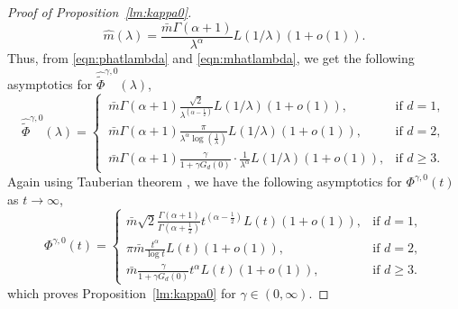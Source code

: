\documentclass{article}[12pt]
\theoremstyle{definition}
\newcommand{\1}{\mathbbm{1}}
\begin{document}
\begin{proof}[Proof of Proposition~\ref{lm:kappa0}]
\begin{equation}
\hat{m}(\lambda) = \frac{\bar{m}{\Gamma(\alpha + 1)}}{\lambda^{\alpha}}L(1/\lambda)(1+o(1)).
\label{eqn:mhatlambda}
\end{equation}
  Thus, from \eqref{eqn:phatlambda} and \eqref{eqn:mhatlambda}, we get the following asymptotics for $\hat{\tilde{\Phi}}^{\gamma, 0}(\lambda)$,
$$\hat{\tilde{\Phi}}^{\gamma, 0}(\lambda) = \begin{cases}
     \, \bar{m}{\Gamma(\alpha + 1)}\frac{\sqrt{2}}{\lambda^{(\alpha -\frac{1}{2})}}L(1/\lambda)(1+o(1)), & \text{if } d=1,\\
   \,  \bar{m}{\Gamma(\alpha + 1)}\frac{\pi}{\lambda^{\alpha}\log\left(\frac{1}{\lambda}\right)}L(1/\lambda)(1+o(1)), & \text{if } d=2,\\
    \, \bar{m}{\Gamma(\alpha + 1)} \frac{\gamma}{1 + \gamma G_d(0)}\cdot \frac{1}{\lambda^{\alpha}}L(1/\lambda)(1+o(1)), & \text{if } d\ge 3.
     \end{cases}$$
Again using Tauberian theorem \cite[Chapter~XIII.5, Theorem~2]{F1971}, we have the following asymptotics for $\Phi^{\gamma,0}(t)$ as $t\to \infty$,
$$\Phi^{\gamma,0}(t) = \begin{cases}
         \bar{m}\sqrt{2} \frac{\Gamma(\alpha+1)}{\Gamma(\alpha+\frac{1}{2}
        )}t^{(\alpha-\frac{1}{2})}L(t)(1+o(1)),& \text{if } d=1,\\
         {\pi \bar{m}} \frac{t^{\alpha}}{\log t}L(t)(1+o(1)), & \text{if } d=2,\\
         {\bar{m}} \frac{\gamma}{1 + \gamma G_d(0)}t^{\alpha}L(t)(1+o(1)), & \text{if } d\ge 3.
         \end{cases}$$
which proves Proposition~\ref{lm:kappa0} for $\gamma \in (0,\infty)$.


\end{proof}
\end{document}
